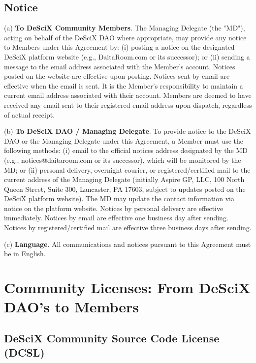 \documentclass{article}
\begin{document}
\subsection{Notice} \label{sec:notice}

(a) \textbf{To DeSciX Community Members}. The Managing Delegate (the "MD"), acting on behalf of the DeSciX DAO where appropriate, may provide any notice to Members under this Agreement by: (i) posting a notice on the designated DeSciX platform website (e.g., DaitaRoom.com or its successor); or (ii) sending a message to the email address associated with the Member's account. Notices posted on the website are effective upon posting. Notices sent by email are effective when the email is sent. It is the Member's responsibility to maintain a current email address associated with their account. Members are deemed to have received any email sent to their registered email address upon dispatch, regardless of actual receipt.

(b) \textbf{To DeSciX DAO / Managing Delegate}. To provide notice to the DeSciX DAO or the Managing Delegate under this Agreement, a Member must use the following methods: (i) email to the official notices address designated by the MD (e.g., notices@daitaroom.com or its successor), which will be monitored by the MD; or (ii) personal delivery, overnight courier, or registered/certified mail to the current address of the Managing Delegate (initially Aspire GP, LLC, 100 North Queen Street, Suite 300, Lancaster, PA 17603, subject to updates posted on the DeSciX platform website). The MD may update the contact information via notice on the platform website. Notices by personal delivery are effective immediately. Notices by email are effective one business day after sending. Notices by registered/certified mail are effective three business days after sending.

(c) \textbf{Language}. All communications and notices pursuant to this Agreement must be in English.

\section{Community Licenses: From DeSciX DAO's to Members}
\subsection{DeSciX Community Source Code License (DCSL)} \label{sec:dcsl}
\end{document}
